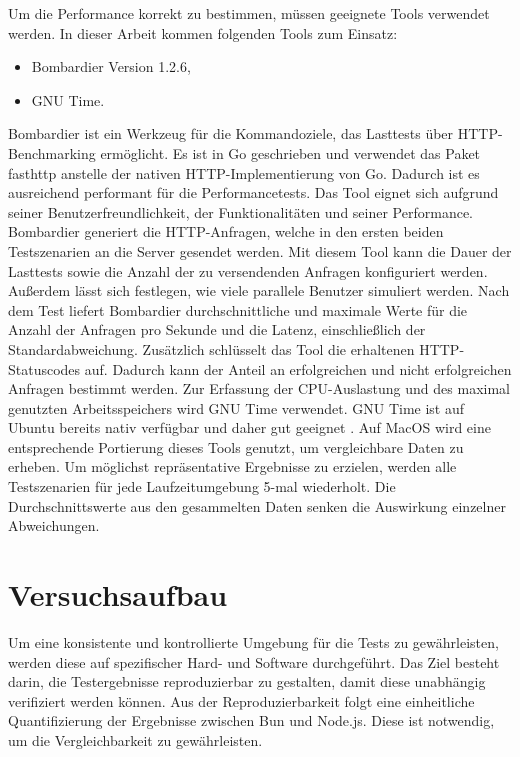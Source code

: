 \noindent
Um die Performance korrekt zu bestimmen, müssen geeignete Tools verwendet werden. In dieser Arbeit kommen folgenden Tools zum Einsatz:

\begin{itemize}
	\item Bombardier Version 1.2.6,
	\item GNU Time.
\end{itemize}

\noindent
Bombardier ist ein Werkzeug für die Kommandoziele, das Lasttests über HTTP-Benchmarking ermöglicht. Es ist in Go geschrieben und verwendet das Paket \glq fasthttp\grq{} anstelle der nativen HTTP-Implementierung von Go. Dadurch ist es ausreichend performant für die Performancetests. Das Tool eignet sich aufgrund seiner Benutzerfreundlichkeit, der Funktionalitäten und seiner Performance. Bombardier generiert die HTTP-Anfragen, welche in den ersten beiden Testszenarien an die Server gesendet werden. Mit diesem Tool kann die Dauer der Lasttests sowie die Anzahl der zu versendenden Anfragen konfiguriert werden. Außerdem lässt sich festlegen, wie viele parallele Benutzer simuliert werden. Nach dem Test liefert Bombardier durchschnittliche und maximale Werte für die Anzahl der Anfragen pro Sekunde und die Latenz, einschließlich der Standardabweichung. Zusätzlich schlüsselt das Tool die erhaltenen HTTP-Statuscodes auf. Dadurch kann der Anteil an erfolgreichen und nicht erfolgreichen Anfragen bestimmt werden.\cite{Fedoseev.2016}\newline
Zur Erfassung der CPU-Auslastung und des maximal genutzten Arbeitsspeichers wird GNU Time verwendet. GNU Time ist auf Ubuntu bereits nativ verfügbar und daher gut geeignet \cite{FreeSoftwareFoundation.2018}. Auf MacOS wird eine entsprechende Portierung dieses Tools genutzt, um vergleichbare Daten zu erheben.\newline
Um möglichst repräsentative Ergebnisse zu erzielen, werden alle Testszenarien für jede Laufzeitumgebung 5-mal wiederholt. Die Durchschnittswerte aus den gesammelten Daten senken die Auswirkung einzelner Abweichungen.


\section{Versuchsaufbau} \label{sec:performance-testSetup}
Um eine konsistente und kontrollierte Umgebung für die Tests zu gewährleisten, werden diese auf spezifischer Hard- und Software durchgeführt. Das Ziel besteht darin, die Testergebnisse reproduzierbar zu gestalten, damit diese unabhängig verifiziert werden können. Aus der Reproduzierbarkeit folgt eine einheitliche Quantifizierung der Ergebnisse zwischen Bun und Node.js. Diese ist notwendig, um die Vergleichbarkeit zu gewährleisten.

